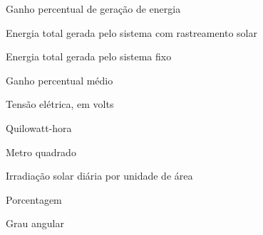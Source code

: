 
\begin{simbolos}
\item[$G(\%)$] Ganho percentual de geração de energia
\item[$E_r$] Energia total gerada pelo sistema com rastreamento solar
\item[$E_f$] Energia total gerada pelo sistema fixo
\item[$G_{\text{média}}$] Ganho percentual médio
\item[$V$] Tensão elétrica, em volts
\item[$kWh$] Quilowatt-hora
\item[$m^{2}$] Metro quadrado
\item[$kWh/m^{2}/dia$] Irradiação solar diária por unidade de área
\item[$\%$] Porcentagem
\item[$^\circ$] Grau angular
\end{simbolos}